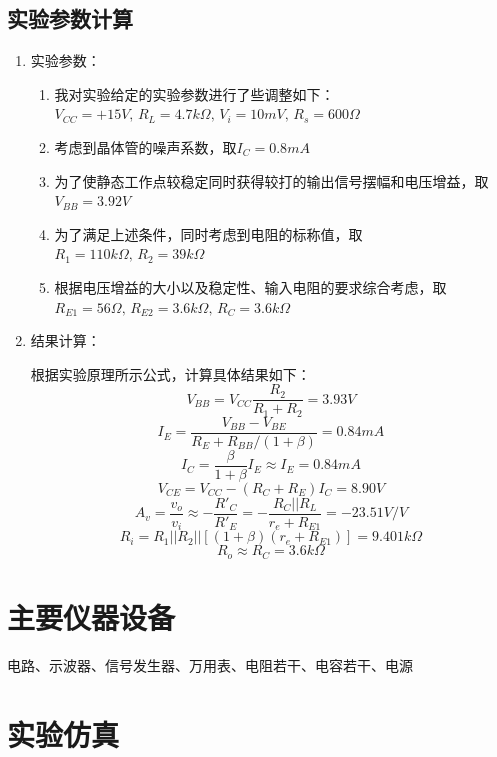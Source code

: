\documentclass{../source/Experiment}
\begin{document}
        \subsection{实验参数计算}
        \begin{enumerate}    
            \item 实验参数：
                \begin{enumerate}
                    \item 我对实验给定的实验参数进行了些调整如下：\\$V_{CC} = +15V,\, R_L = 4.7k \Omega ,\,  V_i = 10mV,\, R_s = 600 \Omega$
                    \item 考虑到晶体管的噪声系数，取$I_C = 0.8mA$
                    \item 为了使静态工作点较稳定同时获得较打的输出信号摆幅和电压增益，取$V_{BB} = 3.92V$
                    \item 为了满足上述条件，同时考虑到电阻的标称值，取$R_1 = 110k \Omega ,\, R_2 = 39k \Omega$
                    \item 根据电压增益的大小以及稳定性、输入电阻的要求综合考虑，取$R_{E1} = 56 \Omega ,\, R_{E2} = 3.6k \Omega ,\, R_C = 3.6k \Omega $
                \end{enumerate}
            \item 结果计算：\par
            根据实验原理所示公式，计算具体结果如下：\\
            $$V_{BB}=V_{CC}\frac{R_2}{R_1+R_2} = 3.93V$$
            $$I_E=\frac{V_{BB}-V_{BE}}{R_E+R_{BB}/(1+\beta)} = 0.84mA$$
            $$I_C=\frac{\beta}{1+\beta}I_E \approx I_E = 0.84mA$$
            $$V_{CE}=V_{CC}-(R_C+R_E)I_C = 8.90V$$
            $$A_v=\frac{v_o}{v_i}\approx-\frac{R'_C}{R'_E}=-\frac{R_C||R_L}{r_e+R_{E1}} = -23.51 V/V$$
            $$R_i=R_1||R_2||[(1+\beta)(r_e+R_{E1})] = 9.401k  \Omega $$
            $$R_o\approx R_C = 3.6k \Omega $$
        \end{enumerate} 
    \section{主要仪器设备}
        电路、示波器、信号发生器、万用表、电阻若干、电容若干、电源
    \section{实验仿真}
\end{document}
